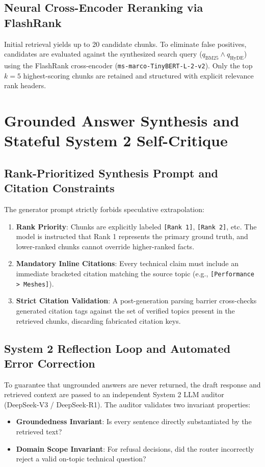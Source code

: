 \documentclass[sigconf,nonacm]{acmart}
\begin{document}
\subsection{Neural Cross-Encoder Reranking via FlashRank}
Initial retrieval yields up to 20 candidate chunks. To eliminate false positives, candidates are evaluated against the synthesized search query ($q_{\text{BM25}} \land q_{\text{HyDE}}$) using the FlashRank cross-encoder (\texttt{ms-marco-TinyBERT-L-2-v2}). Only the top $k=5$ highest-scoring chunks are retained and structured with explicit relevance rank headers.

\section{Grounded Answer Synthesis and Stateful System 2 Self-Critique}

\subsection{Rank-Prioritized Synthesis Prompt and Citation Constraints}
The generator prompt strictly forbids speculative extrapolation:
\begin{enumerate}
    \item \textbf{Rank Priority}: Chunks are explicitly labeled \texttt{[Rank 1]}, \texttt{[Rank 2]}, etc. The model is instructed that Rank 1 represents the primary ground truth, and lower-ranked chunks cannot override higher-ranked facts.
    \item \textbf{Mandatory Inline Citations}: Every technical claim must include an immediate bracketed citation matching the source topic (e.g., \texttt{[Performance > Meshes]}).
    \item \textbf{Strict Citation Validation}: A post-generation parsing barrier cross-checks generated citation tags against the set of verified topics present in the retrieved chunks, discarding fabricated citation keys.
\end{enumerate}

\subsection{System 2 Reflection Loop and Automated Error Correction}
To guarantee that ungrounded answers are never returned, the draft response and retrieved context are passed to an independent System 2 LLM auditor (DeepSeek-V3 / DeepSeek-R1). The auditor validates two invariant properties:
\begin{itemize}
    \item \textbf{Groundedness Invariant}: Is every sentence directly substantiated by the retrieved text?
    \item \textbf{Domain Scope Invariant}: For refusal decisions, did the router incorrectly reject a valid on-topic technical question?
\end{itemize}
\end{document}
